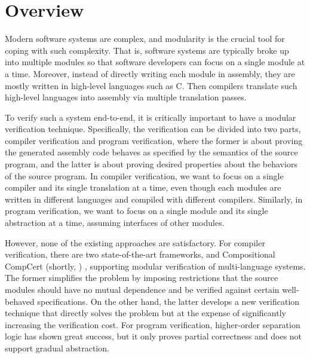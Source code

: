 \chapter{\;\;\;\;Overview}\label{sec:overview}


Modern software systems are complex, and modularity is the crucial tool for coping with such complexity.
That is, software systems are typically broke up into multiple modules so that software developers can focus on a single module at a time.
Moreover, instead of directly writing each module in assembly, they are mostly written in high-level languages such as C.
Then compilers translate such high-level languages into assembly via multiple translation passes.




To verify such a system end-to-end, it is critically important to have a modular verification technique.
Specifically, the verification can be divided into two parts, compiler verification and program verification,
where the former is about proving the generated assembly code behaves as specified by the semantics of the source program,
and the latter is about proving desired properties about the behaviors of the source program.
In compiler verification, we want to focus on a single compiler and its single translation at a time, even though each modules are written in different languages and compiled with different compilers.
Similarly, in program verification, we want to focus on a single module and its single abstraction at a time, assuming interfaces of other modules.




However, none of the existing approaches are satisfactory.
For compiler verification, there are two state-of-the-art frameworks, \ccx{} \cite{gu:dscal,wang:saccx} and Compositional CompCert (shortly, \ccc{}) \cite{beringer:isem,stewart:ccc},
supporting modular verification of multi-language systems. %
The former simplifies the problem by
imposing restrictions that the source modules should have no mutual
dependence and be verified against certain well-behaved
specifications. On the other hand, the latter develops a new
verification technique that directly solves the problem but at the
expense of significantly increasing the verification cost.
For program verification, higher-order separation logic has shown great success, but it only proves partial correctness and does not support gradual abstraction.









